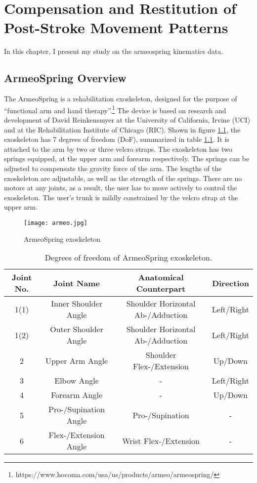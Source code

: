 \chapter{Compensation and Restitution of Post-Stroke Movement Patterns}
\label{cha:armeospring}

In this chapter, I present my study on the armeospring kinematics data.

\section{ArmeoSpring Overview}
\label{sec:overview}

The ArmeoSpring is a rehabilitation exoskeleton, designed for the purpose of ``functional arm and hand therapy''.\footnote{https://www.hocoma.com/usa/us/products/armeo/armeospring/} The device is based on research and development of David Reinkensmyer at the University of California, Irvine (UCI) and at the Rehabilitation Institute of Chicago (RIC). Shown in figure \ref{fig:armeo}, the exoskeleton has 7 degrees of freedom (DoF), summarized in table \ref{tab:devicedof}. It is attached to the arm by two or three velcro straps. The exoskeleton has two springs equipped, at the upper arm and forearm respectively. The springs can be adjusted to compensate the gravity force of the arm. The lengths of the exoskeleton are adjustable, as well as the strength of the springs. There are no motors at any joints, as a result, the user has to move actively to control the exoskeleton. The user's trunk is mildly constrained by the velcro strap at the upper arm. 

\begin{figure}
	\texttt{[image: armeo.jpg]}
	\centering
	\caption{ArmeoSpring exoskeleton}
	\label{fig:armeo}
\end{figure}

\begin{table}
	\begin{tabular}{c c c c}
	\hline
	Joint No. & Joint Name & Anatomical Counterpart & Direction \\
	\hline
	1(1) & Inner Shoulder Angle & Shoulder Horizontal Ab-/Adduction & Left/Right \\
	1(2) & Outer Shoulder Angle & Shoulder Horizontal Ab-/Adduction & Left/Right \\
	2 & Upper Arm Angle & Shoulder Flex-/Extension & Up/Down \\
	3 & Elbow Angle & - & Left/Right \\
	4 & Forearm Angle & - & Up/Down \\
	5 & Pro-/Supination Angle & Pro-/Supination & - \\ 
	6 & Flex-/Extension Angle & Wrist Flex-/Extension & - \\
	\hline
	\end{tabular}
	\caption{Degrees of freedom of ArmeoSpring exoskeleton.}
	\label{tab:devicedof}
\end{table}

